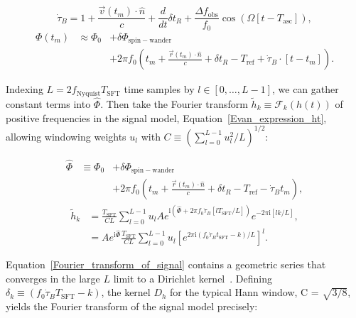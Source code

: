 \documentclass[12pt]{iopart}
\begin{document}
\begin{equation}
\dot{\tau}_B = 1 + \frac{\vec{v}(t_m) \cdot \hat{n}}{c} + \frac{d}{dt}\delta t_R+ \frac{\Delta f_\mathrm{obs}}{f_0} \cos \left(\Omega [t - T_\mathrm{asc}]\right),
\label{tau-time-derivative}
\end{equation}
\begin{eqnarray}
\Phi(t_m) &\approx \Phi_0 &+ \delta \Phi_\mathrm{spin-wander} \nonumber \\
  & &+ 2 \pi f_0 \left(t_m + \frac{\vec{r}(t_m)\cdot \hat{n}}{c} +\delta t_R- T_\mathrm{ref} + \dot{\tau}_B \cdot [t-t_m] \right). 
\end{eqnarray}

\noindent Indexing $L = 2f_\mathrm{Nyquist}T_\mathrm{SFT}$ time samples by $l\in [0,\ldots,L-1]$, we can gather constant terms into $\hat{\Phi}$.
Then take the Fourier transform $\tilde{h}_k \equiv \mathcal{F}_k(h(t))$ of positive frequencies in the signal model, Equation~\ref{Evan_expression_ht}, allowing windowing weights $u_l$ with $C\equiv\left(\sum_{l=0}^{L-1} u_l^2 / L \right)^{1/2}$:

\begin{eqnarray} 
\hat{\Phi} &\equiv \Phi_0 &+ \delta\Phi_\mathrm{spin-wander} \nonumber\\
  & &+ 2\pi f_0 \left(t_m + \frac{\vec{r}(t_m)\cdot\hat{n}}{c} +\delta t_R- T_\mathrm{ref} - \dot{\tau}_B t_m\right),
\end{eqnarray}
\begin{eqnarray}
\tilde{h}_k 
  &= \frac{T_\mathrm{SFT}}{CL} \sum\limits^{L-1}_{l=0} u_l A e^{\mathrm{i} \left(\hat{\Phi} + 2\pi f_0 \dot{\tau}_B [l T_\mathrm{SFT}/L]\right)} e^{- 2\pi \mathrm{i} [lk /L]},\\ 
  &= A e^{\mathrm{i} \hat{\Phi}} \frac{T_\mathrm{SFT}}{CL} \sum\limits^{L-1}_{l=0} u_l \left[e^{2\pi \mathrm{i} \left(f_0 \dot{\tau}_B t_\mathrm{SFT} - k\right)/L} \right]^l.
\label{Fourier_transform_of_signal}
\end{eqnarray}

\noindent Equation~\ref{Fourier_transform_of_signal} contains a geometric series that converges in the large $L$ limit to a Dirichlet kernel~\cite{TwoSpectCoherentGoetz2015}.
Defining $\delta_k \equiv \left(f_0 \dot{\tau}_B T_\mathrm{SFT} - k\right)$, the kernel $D_h$ for the typical Hann window, C = $\sqrt{3/8}$, yields the Fourier transform of the signal model precisely:
\end{document}
